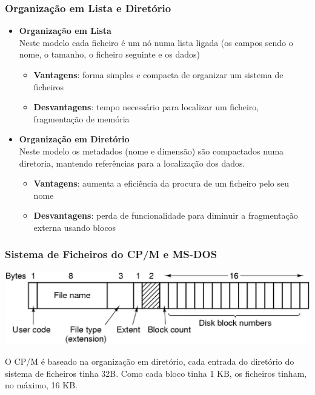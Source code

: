 \documentclass[11pt]{article}
\begin{document}
\subsubsection{Organização em Lista e Diretório}

\begin{itemize}
    \item \textbf{Organização em Lista} \\[4pt]
          Neste modelo cada ficheiro é um nó numa lista ligada (os campos sendo o nome, o tamanho, o ficheiro seguinte e os dados)
          \begin{itemize}
              \item \textbf{Vantagens}: forma simples e compacta de organizar um sistema de ficheiros
              \item \textbf{Desvantagens}: tempo necessário para localizar um ficheiro, fragmentação de memória
          \end{itemize}
    \item \textbf{Organização em Diretório} \\[4pt]
          Neste modelo os metadados (nome e dimensão) são compactados numa diretoria, mantendo referências para a localização dos dados.
          \begin{itemize}
              \item \textbf{Vantagens}: aumenta a eficiência da procura de um ficheiro pelo seu nome
              \item \textbf{Desvantagens}: perda de funcionalidade para diminuir a fragmentação externa usando blocos
          \end{itemize}
\end{itemize}

\subsubsection{Sistema de Ficheiros do CP/M e MS-DOS}

\includegraphics[scale=0.35,center]{cpm.png}

O CP/M é baseado na organização em diretório, cada entrada do diretório do sistema de ficheiros tinha 32B. Como cada bloco tinha 1 KB, os ficheiros tinham, no máximo, 16 KB.
\end{document}
